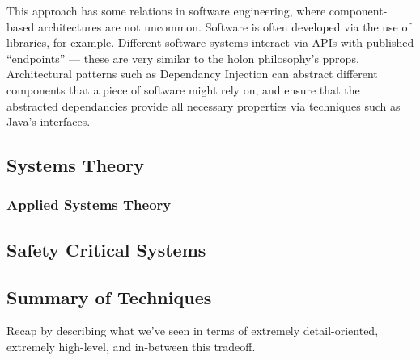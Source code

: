 This approach has some relations in software engineering, where component-based
architectures are not uncommon. Software is often developed via the use of
libraries, for example. Different software systems interact via APIs with
published ``endpoints'' --- these are very similar to the holon philosophy's
pprops. Architectural patterns such as Dependancy Injection can abstract
different components that a piece of software might rely on, and ensure that the
abstracted dependancies provide all necessary properties via techniques such as
Java's interfaces.
\par

\subsection{Systems Theory}

\subsubsection{Applied Systems Theory}\label{sec:review-applied-systems-theory}


\subsection{Safety Critical Systems}


\subsection{Summary of Techniques}
Recap by describing what we've seen in terms of extremely detail-oriented, extremely high-level, and in-between this tradeoff.
  
